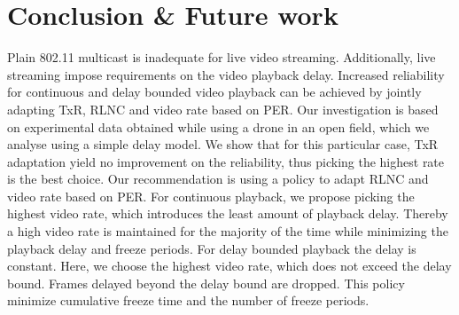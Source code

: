 \section{Conclusion \& Future work}\label{sec:conc}
Plain 802.11 multicast is inadequate for live video streaming. Additionally, live streaming impose requirements on the video playback delay. Increased reliability for continuous and delay bounded video playback can be achieved by jointly adapting TxR, RLNC and video rate based on PER. Our investigation is based on experimental data obtained while using a drone in an open field, which we analyse using a simple delay model. We show that for this particular case, TxR adaptation yield no improvement on the reliability, thus picking the highest rate is the best choice. Our recommendation is using a policy to adapt RLNC and video rate based on PER. For continuous playback, we propose picking the highest video rate, which introduces the least amount of playback delay. Thereby a high video rate is maintained for the majority of the time while minimizing the playback delay and freeze periods. For delay bounded playback the delay is constant. Here, we choose the highest video rate, which does not exceed the delay bound. Frames delayed beyond the delay bound are dropped. This policy minimize cumulative freeze time and the number of freeze periods.

